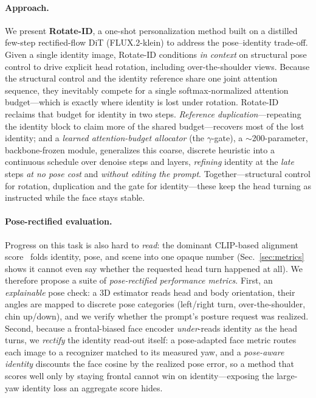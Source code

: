 \paragraph{Approach.}
We present \textbf{Rotate-ID}, a one-shot personalization method built on a distilled few-step rectified-flow DiT (FLUX.2-klein) to address the pose--identity trade-off. Given a single identity image, Rotate-ID conditions \emph{in context} on structural pose control to drive explicit head rotation, including over-the-shoulder views. Because the structural control and the identity reference share one joint attention sequence, they inevitably compete for a single softmax-normalized attention budget---which is exactly where identity is lost under rotation. Rotate-ID reclaims that budget for identity in two steps. \emph{Reference duplication}---repeating the identity block to claim more of the shared budget---recovers most of the lost identity; and a \emph{learned attention-budget allocator} (the $\gamma$-gate), a $\sim$200-parameter, backbone-frozen module, generalizes this coarse, discrete heuristic into a continuous schedule over denoise steps and layers, \emph{refining} identity at the \emph{late} steps \emph{at no pose cost} and \emph{without editing the prompt}. Together---structural control for rotation, duplication and the gate for identity---these keep the head turning as instructed while the face stays stable.

\paragraph{Pose-rectified evaluation.} Progress on this task is also hard to \emph{read}: the dominant CLIP-based alignment score~\cite{clipscore} folds identity, pose, and scene into one opaque number (Sec.~\ref{sec:metrics} shows it cannot even say whether the requested head turn happened at all). We therefore propose a suite of \emph{pose-rectified performance metrics}. First, an \emph{explainable} pose check: a 3D estimator reads head and body orientation, their angles are mapped to discrete pose categories (left/right turn, over-the-shoulder, chin up/down), and we verify whether the prompt's posture request was realized. Second, because a frontal-biased face encoder \emph{under}-reads identity as the head turns, we \emph{rectify} the identity read-out itself: a pose-adapted face metric routes each image to a recognizer matched to its measured yaw, and a \emph{pose-aware identity} discounts the face cosine by the realized pose error, so a method that scores well only by staying frontal cannot win on identity---exposing the large-yaw identity loss an aggregate score hides.

